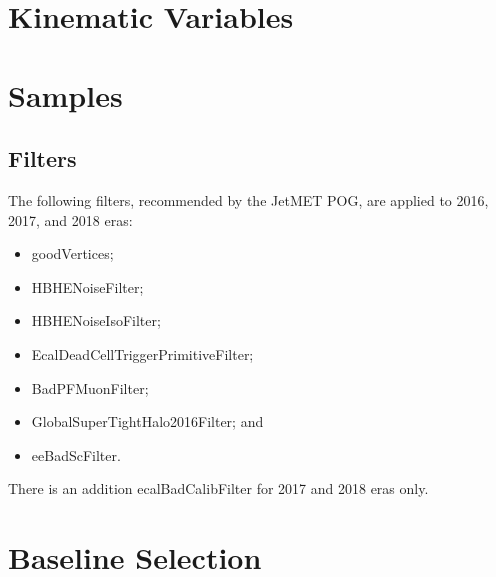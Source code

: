 \section{Kinematic Variables}\label{sec:kinematicVar}

\section{Samples}\label{Samples}



\subsection{Filters}
The following filters, recommended by the JetMET POG, are applied to 2016, 2017, and 2018 eras:
\begin{itemize}
	\item goodVertices;
	\item HBHENoiseFilter;
	\item HBHENoiseIsoFilter;
	\item EcalDeadCellTriggerPrimitiveFilter;
	\item BadPFMuonFilter;
	\item GlobalSuperTightHalo2016Filter; and
	\item eeBadScFilter.
\end{itemize}
There is an addition ecalBadCalibFilter for 2017 and 2018 eras only.

\section{Baseline Selection} \label{sec:Baseline}

